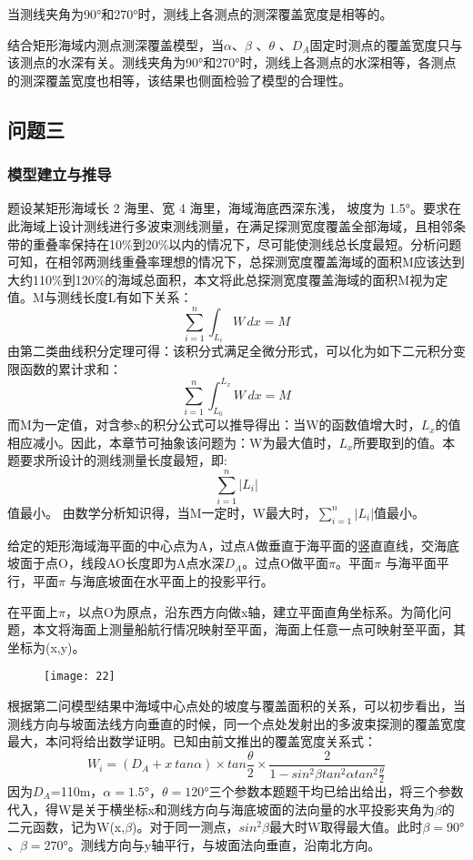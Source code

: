 \documentclass[withoutpreface,bwprint]{cumcmthesis} %
\begin{document}
当测线夹角为90°和270°时，测线上各测点的测深覆盖宽度是相等的。

结合矩形海域内测点测深覆盖模型，当$\alpha $、$\beta$ 、$\theta$ 、$D_A$固定时测点的覆盖宽度只与该测点的水深有关。测线夹角为90°和270°时，测线上各测点的水深相等，各测点的测深覆盖宽度也相等，该结果也侧面检验了模型的合理性。

\subsection{问题三}
\subsubsection{模型建立与推导}
题设某矩形海域长 2 海里、宽 4 海里，海域海底西深东浅， 坡度为 1.5°。要求在此海域上设计测线进行多波束测线测量，在满足探测宽度覆盖全部海域，且相邻条带的重叠率保持在10\%到20\%以内的情况下，尽可能使测线总长度最短。分析问题可知，在相邻两测线重叠率理想的情况下，总探测宽度覆盖海域的面积M应该达到大约110\%到120\%的海域总面积，本文将此总探测宽度覆盖海域的面积M视为定值。M与测线长度L有如下关系：
\begin{equation}
\sum_{i=1}^{n}{\int_{L_i}{W}\,dx}=M
\end{equation}
由第二类曲线积分定理可得：该积分式满足全微分形式，可以化为如下二元积分变限函数的累计求和：
\begin{equation}
\sum_{i=1}^{n}{\int_{L_0}^{L_x}{W}\,dx}=M
\end{equation}
而M为一定值，对含参x的积分公式可以推导得出：当W的函数值增大时，$L_x$的值相应减小。因此，本章节可抽象该问题为：W为最大值时，$L_x$所要取到的值。本题要求所设计的测线测量长度最短，即:
\begin{equation}
\sum_{i=1}^{n}{|L_i|}
\end{equation}
值最小。
由数学分析知识得，当M一定时，W最大时，$\sum_{i=1}^{n}{|L_i|}$值最小。

给定的矩形海域海平面的中心点为A，过点A做垂直于海平面的竖直直线，交海底坡面于点O，线段AO长度即为A点水深$D_A$。过点O做平面$\pi$。平面$\pi$ 与海平面平行，平面$\pi$ 与海底坡面在水平面上的投影平行。

在平面上$\pi$，以点O为原点，沿东西方向做x轴，建立平面直角坐标系。为简化问题，本文将海面上测量船航行情况映射至平面，海面上任意一点可映射至平面，其坐标为(x,y)。
\begin{figure}[H]
    \centering
    \texttt{[image: 22]}
    \caption{}
    \label{fig:four}
\end{figure}
根据第二问模型结果中海域中心点处的坡度与覆盖面积的关系，可以初步看出，当测线方向与坡面法线方向垂直的时候，同一个点处发射出的多波束探测的覆盖宽度最大，本问将给出数学证明。已知由前文推出的覆盖宽度关系式：
\begin{equation}
W_i=(D_A+x\ tan\alpha)\times tan{\frac{\theta}{2}}\times \frac{2}{1-sin^2{\beta}tan^2{\alpha}tan^2{\frac{\theta}{2}}}
\end{equation}
因为$D_A$=110m，$\alpha=1.5°$，$\theta=120°$三个参数本题题干均已给出给出，将三个参数代入，得W是关于横坐标x和测线方向与海底坡面的法向量的水平投影夹角为$\beta$的二元函数，记为W(x,$\beta$)。对于同一测点，$sin^2\beta$最大时W取得最大值。此时$\beta=90°$、$\beta=270°$。测线方向与y轴平行，与坡面法向垂直，沿南北方向。
\end{document}
